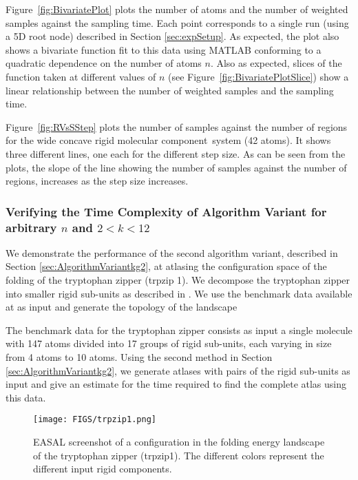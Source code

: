 \documentclass[]{article}
\newcommand{\figref}[1]{Figure~\ref{#1}}
\newcommand{\rmc}{rigid molecular component}
\begin{document}
\figref{fig:BivariatePlot} plots the number of atoms and the number of weighted
samples against the sampling time. Each point corresponds to a single run
(using a 5D root node) described in Section \ref{sec:expSetup}. As expected, the plot also
shows a bivariate function fit to this data using MATLAB conforming to a
quadratic dependence on the number of atoms $n$. Also as expected, slices of
the function taken at different values of $n$ (see
\figref{fig:BivariatePlotSlice}) show a linear relationship between the number
of weighted samples and the sampling time. 

\figref{fig:RVsSStep} plots the number of samples against the number of regions
for the wide concave \rmc\ system (42 atoms). It shows three different
lines, one each for the different step size. As can be seen from the plots, the
slope of the line showing the number of samples against
the number of regions, increases as the step size increases.

\subsubsection{Verifying the Time Complexity of Algorithm Variant for arbitrary $n$ and $2<k<12$}
\label{sec:results:variantComplexity}
We demonstrate the performance of the second algorithm variant, described in
Section \ref{sec:AlgorithmVariantkg2}, at atlasing the configuration space of
the folding of the tryptophan zipper (trpzip 1). We decompose the tryptophan
zipper into smaller rigid sub-units as described in \cite{joseph2017exploring,
kusumaatmaja2012local}. We use the benchmark data available at \cite{optmin} as
input and generate the topology of the landscape 

The benchmark data for the tryptophan zipper consists as input a single
molecule with 147 atoms divided into 17 groups of rigid sub-units, each varying
in size from 4 atoms to 10 atoms. Using the second method in Section
\ref{sec:AlgorithmVariantkg2}, we generate atlases with pairs of the rigid
sub-units as input and give an estimate for the time required to find the
complete atlas using this data.

\begin{figure}[htpb]
\centering
\texttt{[image: FIGS/trpzip1.png]}
\caption{EASAL screenshot of a configuration in the folding energy 
landscape of the tryptophan zipper (trpzip1). The different colors represent the 
different input rigid components.}
\label{fig:tryptophan}
\end{figure}
\end{document}

